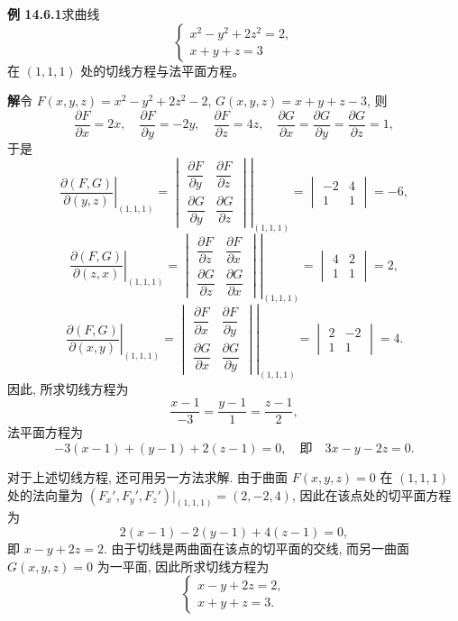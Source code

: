 \documentclass[UTF8, 12pt, fontset=fandol, oneside]{ctexart}
\begin{document}
\noindent\textbf{例 14.6.1}\quad 求曲线
\[
  \begin{cases}
    x^2-y^2+2z^2=2,\\
    x+y+z=3
  \end{cases}
\]
在 $(1,1,1)$ 处的切线方程与法平面方程。

\noindent\textbf{解}\quad 令 $F(x,y,z)=x^2-y^2+2z^2-2$, $G(x,y,z)=x+y+z-3$, 则
\[
  \frac{\partial F}{\partial x}=2x,\quad
  \frac{\partial F}{\partial y}=-2y,\quad
  \frac{\partial F}{\partial z}=4z,\quad
  \frac{\partial G}{\partial x}
  =
  \frac{\partial G}{\partial y}
  =
  \frac{\partial G}{\partial z}
  =1,
\]
于是
\[
  \left.\frac{\partial(F,G)}{\partial(y,z)}\right|_{(1,1,1)}
  =
  \left.
  \begin{vmatrix}
    \dfrac{\partial F}{\partial y} & \dfrac{\partial F}{\partial z}\\
    \dfrac{\partial G}{\partial y} & \dfrac{\partial G}{\partial z}
  \end{vmatrix}
  \right|_{(1,1,1)}
  =
  \begin{vmatrix}
    -2 & 4\\
    1 & 1
  \end{vmatrix}
  =-6,
\]
\[
  \left.\frac{\partial(F,G)}{\partial(z,x)}\right|_{(1,1,1)}
  =
  \left.
  \begin{vmatrix}
    \dfrac{\partial F}{\partial z} & \dfrac{\partial F}{\partial x}\\
    \dfrac{\partial G}{\partial z} & \dfrac{\partial G}{\partial x}
  \end{vmatrix}
  \right|_{(1,1,1)}
  =
  \begin{vmatrix}
    4 & 2\\
    1 & 1
  \end{vmatrix}
  =2,
\]
\[
  \left.\frac{\partial(F,G)}{\partial(x,y)}\right|_{(1,1,1)}
  =
  \left.
  \begin{vmatrix}
    \dfrac{\partial F}{\partial x} & \dfrac{\partial F}{\partial y}\\
    \dfrac{\partial G}{\partial x} & \dfrac{\partial G}{\partial y}
  \end{vmatrix}
  \right|_{(1,1,1)}
  =
  \begin{vmatrix}
    2 & -2\\
    1 & 1
  \end{vmatrix}
  =4.
\]
因此, 所求切线方程为
\[
  \frac{x-1}{-3}=\frac{y-1}{1}=\frac{z-1}{2},
\]
法平面方程为
\[
  -3(x-1)+(y-1)+2(z-1)=0,\quad \text{即}\quad 3x-y-2z=0.
\]

对于上述切线方程, 还可用另一方法求解. 由于曲面 $F(x,y,z)=0$ 在 $(1,1,1)$ 处的法向量为 $(F_x',F_y',F_z')|_{(1,1,1)}=(2,-2,4)$, 因此在该点处的切平面方程为
\[
  2(x-1)-2(y-1)+4(z-1)=0,
\]
即 $x-y+2z=2$. 由于切线是两曲面在该点的切平面的交线, 而另一曲面 $G(x,y,z)=0$ 为一平面, 因此所求切线方程为
\[
  \begin{cases}
    x-y+2z=2,\\
    x+y+z=3.
  \end{cases}
\]
\end{document}
